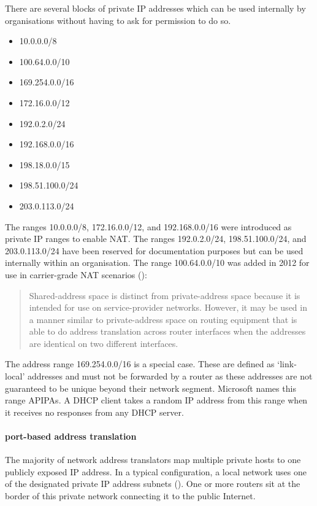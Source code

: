 There are several blocks of private \acs{IP} addresses which can be used internally by organisations without having to ask for permission to do so.
\begin{multicols}{2}
\raggedcolumns
\begin{itemize}
\item 10.0.0.0/8
\item 100.64.0.0/10
\item 169.254.0.0/16
\item 172.16.0.0/12
\item 192.0.2.0/24
\item 192.168.0.0/16
\item 198.18.0.0/15
\item 198.51.100.0/24
\item 203.0.113.0/24
\end{itemize}
\end{multicols}

The ranges 10.0.0.0/8, 172.16.0.0/12, and 192.168.0.0/16 were introduced as private IP ranges to enable \acf{NAT}.
The ranges 192.0.2.0/24, 198.51.100.0/24, and 203.0.113.0/24 have been reserved for documentation purposes but can be used internally within an organisation.
The range 100.64.0.0/10 was added in 2012 for use in carrier-grade \ac{NAT} scenarios ():

\begin{quote}
Shared-address space is distinct from  private-address space because it is intended for use on service-provider networks.
However, it may be used in a manner similar to  private-address space on routing equipment that is able to do address translation across router interfaces when the addresses are identical on two different interfaces.
\end{quote}

The address range 169.254.0.0/16 is a special case.
These are defined as `link-local' addresses and must not be forwarded by a router as these addresses are not guaranteed to be unique beyond their network segment.%
Microsoft names this range \acp{APIPA}.%
A \acs{DHCP} client takes a random \acs{IP} address from this range when it receives no responses from any \acs{DHCP} server.

\paragraph{port-based address translation}
The majority of network address translators map multiple private hosts to one publicly exposed \acs{IP} address.
In a typical configuration, a local network uses one of the designated private \acs{IP} address subnets ().
One or more routers sit at the border of this private network connecting it to the public Internet.

